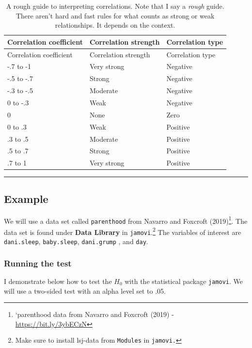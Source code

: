 \documentclass[
]{article}
\begin{document}
\begin{longtable}[]{@{}lll@{}}
\caption{\label{tab:correlation-table} A rough guide to interpreting correlations. Note that I say a \emph{rough} guide. There aren't hard and fast rules for what counts as strong or weak relationships. It depends on the context.}\tabularnewline
\toprule()
Correlation coefficient & Correlation strength & Correlation type \\
\midrule()
\endfirsthead
\toprule()
Correlation coefficient & Correlation strength & Correlation type \\
\midrule()
\endhead
-.7 to -1 & Very strong & Negative \\
-.5 to -.7 & Strong & Negative \\
-.3 to -.5 & Moderate & Negative \\
0 to -.3 & Weak & Negative \\
0 & None & Zero \\
0 to .3 & Weak & Positive \\
.3 to .5 & Moderate & Positive \\
.5 to .7 & Strong & Positive \\
.7 to 1 & Very strong & Positive \\
\bottomrule()
\end{longtable}

\begin{center}\rule{0.5\linewidth}{0.5pt}\end{center}

\hypertarget{example}{%
\subsection{Example}\label{example}}

We will use a data set called \texttt{parenthood} from Navarro and Foxcroft (2019)\footnote{`parenthood data from Navarro and Foxcroft (2019) - \url{https://bit.ly/3ybECzN}}. The data set is found under \textbf{Data Library} in \texttt{jamovi}.\footnote{Make sure to install lsj-data from \texttt{Modules} in \texttt{jamovi.}} The variables of interest are \texttt{dani.sleep}, \texttt{baby.sleep}, \texttt{dani.grump} , and \texttt{day}.

\hypertarget{running-the-test}{%
\subsubsection{Running the test}\label{running-the-test}}

I demonstrate below how to test the \(H_0\) with the statistical package \texttt{jamovi}. We will use a two-sided test with an alpha level set to .05.
\end{document}
